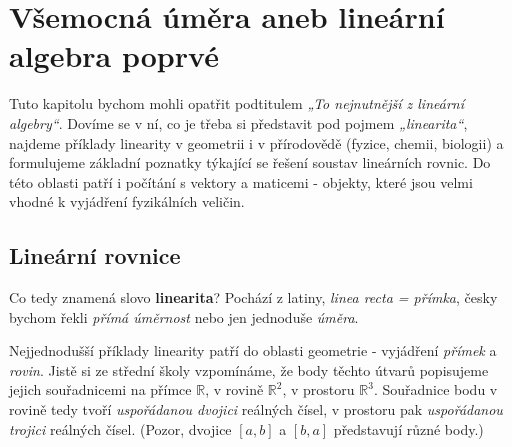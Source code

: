 \setchaptertoc
\chapter{Všemocná úměra aneb lineární algebra poprvé}\label{mai:IchapII}

  Tuto kapitolu bychom mohli opatřit podtitulem \emph{„To nejnutnější z lineární algebry“}. Dovíme
  se v ní, co je třeba si představit pod pojmem \emph{„linearita“}, najdeme příklady linearity v
  geometrii i v přírodovědě (fyzice, chemii, biologii) a formulujeme základní poznatky týkající se
  řešení soustav lineárních rovnic. Do této oblasti patří i počítání s vektory a maticemi - objekty,
  které jsou velmi vhodné k vyjádření fyzikálních veličin.
    
  \section{Lineární rovnice}\label{mai:IchapIIsecI}
    Co tedy znamená slovo \textbf{linearita}? Pochází z latiny, \emph{linea recta = přímka}, 
    česky bychom řekli \emph{přímá úměrnost} nebo jen jednoduše \emph{úměra}.
    
    Nejjednodušší příklady linearity patří do oblasti geometrie - vyjádření \emph{přímek} a 
    \emph{rovin}. Jistě si ze střední školy vzpomínáme, že body těchto útvarů popisujeme jejich 
    souřadnicemi na přímce \(\mathbb{R}\), v rovině \(\mathbb{R}^2\), v prostoru \(\mathbb{R}^3\). 
    Souřadnice bodu v rovině tedy tvoří \emph{uspořádanou dvojici} reálných čísel, v prostoru pak 
    \emph{uspořádanou trojici} reálných čísel. (Pozor, dvojice \([a, b]\) a \([b, a]\) představují 
    různé body.)
    
